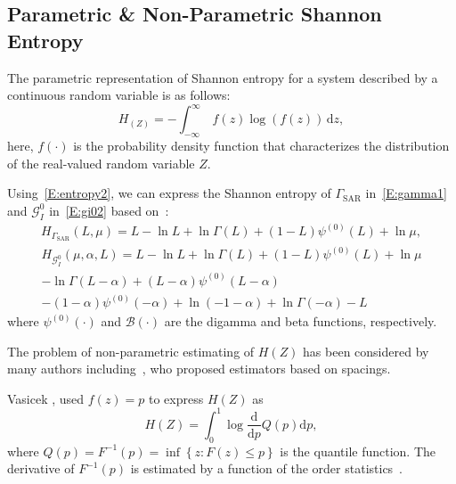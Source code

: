 \documentclass[conference]{IEEEtran}
\begin{document}
{\subsection{Parametric \& Non-Parametric Shannon Entropy}

The parametric representation of Shannon entropy for a system described by a continuous random variable is as follows:
\begin{equation}
  \label{E:entropy2}
  H_(Z)=-\int_{-\infty }^\infty \ f(z)\log(f(z))\, \mathrm{d}z,
\end{equation}
here, $f(\cdot)$ is the probability density function that characterizes the distribution of the real-valued random variable $Z$.

Using~\eqref{E:entropy2}, we can express the Shannon entropy of $\Gamma_{\text{SAR}}$ in~\eqref{E:gamma1} and $\mathcal{G}_I^0$ in~\eqref{E:gi02} based on~\cite{Cassetti2022, A.Ferreira2020}:
\begin{multline}
\label{E:E-gamma}
H_{\Gamma_{\text{SAR}}}(L, \mu) =   L -\ln L+\ln\Gamma(L)+(1-L)\psi^{(0)}(L) + \ln \mu, 
\end{multline}
\begin{multline}
\label{E:E-GIO}
H_{\mathcal{G}_I^0}(\mu, \alpha, L) =L -\ln L+\ln\Gamma(L)+(1-L)\psi^{(0)}(L) +\ln \mu \\
-\ln\Gamma(L-\alpha)+ (L-\alpha) \psi^{(0)}(L-\alpha)\\
-(1-\alpha)\psi^{(0)}(-\alpha)+\ln (-1-\alpha)+\ln\Gamma(-\alpha)-L
\end{multline}
where $\psi^{(0)}(\cdot)$ and $\mathcal{B}(\cdot)$ are the digamma and beta functions, respectively.







The problem of non-parametric estimating of $H(Z)$ has been considered by many authors including~\cite{vasicek1976test, Bert1992, Wieczorkowski1999, correa1995new}, who proposed estimators based on spacings.

Vasicek \cite{vasicek1976test}, used $f(z)=p$  to express $ H(Z)$ as
\begin{equation*}
	H(Z)= \int_0^1 \log\frac{\mathrm{d}}{\mathrm{d}p}Q(p)\mathrm{d}p,
\end{equation*}
where $Q(p)=F^{-1}(p)=\inf\left\{z: F(z)\leq p\right\}$ is the quantile function. The derivative of $F^{-1}(p)$ is  estimated by a function of the order statistics~\cite{AlOmari2019}.

}
\end{document}
